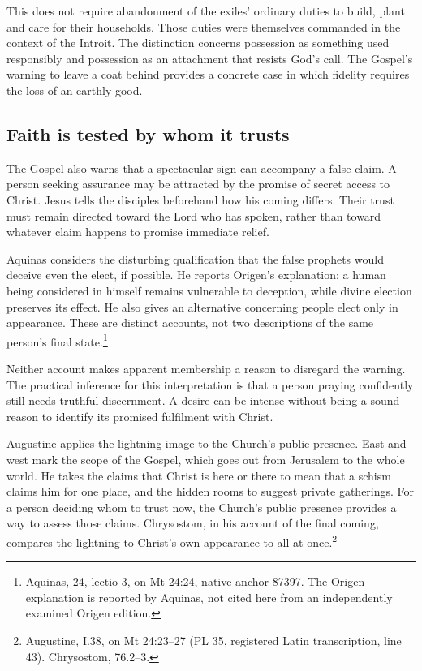 This does not require abandonment of the
exiles' ordinary duties to build, plant and
care for their households. Those duties were
themselves commanded in the context of the
Introit. The distinction concerns possession
as something used responsibly and possession
as an attachment that resists God's call.
The Gospel's warning to leave a coat behind
provides a concrete case in which fidelity
requires the loss of an earthly good.

\subsection{Faith is tested by whom it trusts}

The Gospel also warns that a spectacular sign
can accompany a false claim. A person seeking
assurance may be attracted by the promise of
secret access to Christ. Jesus tells the
disciples beforehand how his coming differs.
Their trust must remain directed toward the
Lord who has spoken, rather than toward
whatever claim happens to promise immediate
relief.

Aquinas considers the disturbing qualification
that the false prophets would deceive even
the elect, if possible. He reports Origen's
explanation: a human being considered in
himself remains vulnerable to deception,
while divine election preserves its effect.
He also gives an alternative concerning
people elect only in appearance. These
are distinct accounts, not two descriptions
of the same person's final
state.\footnote{Aquinas, 
24, lectio 3, on Mt 24:24, native anchor
87397. The Origen explanation is reported
by Aquinas, not cited here from an
independently examined Origen edition.}

Neither account makes apparent membership
a reason to disregard the warning.
The practical inference for this interpretation
is that a person praying confidently still
needs truthful discernment. A desire can
be intense without being a sound reason
to identify its promised fulfilment with
Christ.

Augustine applies the lightning image to the Church's public
presence. East and west mark the scope of the Gospel, which goes
out from Jerusalem to the whole world. He takes the claims that
Christ is here or there to mean that a schism claims him for one
place, and the hidden rooms to suggest private gatherings. For a
person deciding whom to trust now, the Church's public presence
provides a way to assess those claims. Chrysostom, in his account
of the final coming, compares the lightning to Christ's own
appearance to all at once.\footnote{Augustine,
 I.38, on Mt 24:23--27
(PL 35, registered Latin transcription, line 43).
Chrysostom,  76.2--3.}

